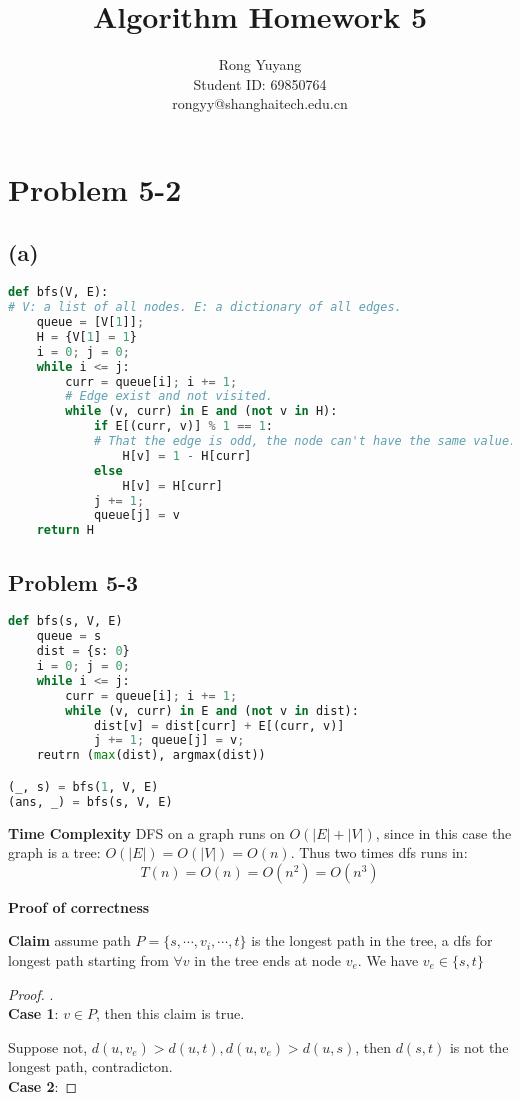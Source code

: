 \documentclass{article}
\title{Algorithm Homework 5}
\author{Rong Yuyang \\ Student ID: 69850764 \\ rongyy@shanghaitech.edu.cn}
\begin{document}
\maketitle

\section*{Problem 5-2}
\subsection*{(a)}
\begin{lstlisting}[language = python]
def bfs(V, E):
# V: a list of all nodes. E: a dictionary of all edges.
    queue = [V[1]];
    H = {V[1] = 1}
    i = 0; j = 0;
    while i <= j:
        curr = queue[i]; i += 1;
        # Edge exist and not visited.
        while (v, curr) in E and (not v in H):
            if E[(curr, v)] % 1 == 1:
            # That the edge is odd, the node can't have the same value.
                H[v] = 1 - H[curr]
            else
                H[v] = H[curr]
            j += 1;
            queue[j] = v
    return H
\end{lstlisting}
\subsection{Problem 5-3}
\begin{lstlisting}[language = python]
def bfs(s, V, E)
    queue = s
    dist = {s: 0}
    i = 0; j = 0;
    while i <= j:
        curr = queue[i]; i += 1;
        while (v, curr) in E and (not v in dist):
            dist[v] = dist[curr] + E[(curr, v)]
            j += 1; queue[j] = v;
    reutrn (max(dist), argmax(dist))

(_, s) = bfs(1, V, E)
(ans, _) = bfs(s, V, E)
\end{lstlisting}
\par \textbf{Time Complexity} DFS on a graph runs on $O(|E| + |V|)$, since in this case the graph is a tree: $O(|E|) = O(|V|) = O(n)$. Thus two times dfs runs in:
$$T(n) = O(n) = O(n^2) = O(n^3)$$
\par \textbf{Proof of correctness} 
\par \textbf{Claim} assume path $ P = \{s, \cdots, v_i, \cdots, t\}$ is the longest path in the tree, a dfs for longest path starting from $\forall v$ in the tree ends at node $v_e$. We have $v_e \in \{s, t\}$
\begin{proof}. \\
    \textbf{Case 1}: $v \in P$, then this claim is true. 
    \par Suppose not, $d(u, v_e) > d(u, t), d(u, v_e) > d(u, s)$, then $d(s, t)$ is not the longest path, contradicton. \\
    \textbf{Case 2}: 
\end{proof}
\end{document}
